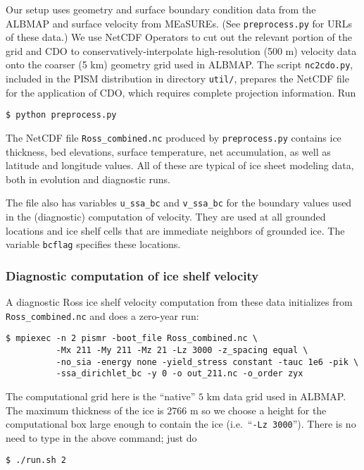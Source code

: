 Our setup uses geometry and surface boundary condition data from the ALBMAP and surface velocity from MEaSUREs.  (See \texttt{preprocess.py} for URLs of these data.)  We use NetCDF Operators to cut out the relevant portion of the grid and CDO to conservatively-interpolate high-resolution (500 m) velocity data onto the coarser (5 km) geometry grid used in ALBMAP.  The script \texttt{nc2cdo.py}, included in the PISM distribution in directory \texttt{util/}, prepares the NetCDF file for the application of CDO, which requires complete projection information.  Run

\begin{verbatim}
$ python preprocess.py
\end{verbatim}%

The NetCDF file \texttt{Ross_combined.nc} produced by \texttt{preprocess.py} contains ice thickness, bed elevations, surface temperature, net accumulation, as well as latitude and longitude values.  All of these are typical of ice sheet modeling data, both in evolution and diagnostic runs.

The file also has variables \texttt{u_ssa_bc} and \texttt{v_ssa_bc} for the boundary values used in the (diagnostic) computation of velocity.  They are used at all grounded locations and ice shelf cells that are immediate neighbors of grounded ice.  The variable \texttt{bcflag} specifies these locations.


\subsubsection*{Diagnostic computation of ice shelf velocity}
A diagnostic Ross ice shelf velocity computation from these data initializes from \texttt{Ross_combined.nc} and does a zero-year run:

\begin{verbatim}
$ mpiexec -n 2 pismr -boot_file Ross_combined.nc \
          -Mx 211 -My 211 -Mz 21 -Lz 3000 -z_spacing equal \
          -no_sia -energy none -yield_stress constant -tauc 1e6 -pik \
          -ssa_dirichlet_bc -y 0 -o out_211.nc -o_order zyx
\end{verbatim}%
The computational grid here is the ``native'' $5$ km data grid used in ALBMAP.  The maximum thickness of the ice is $2766$ m so we choose a height for the computational box large enough to contain the ice (i.e.~``\texttt{-Lz 3000}'').  There is no need to type in the above command; just do

\begin{verbatim}
$ ./run.sh 2
\end{verbatim}%

